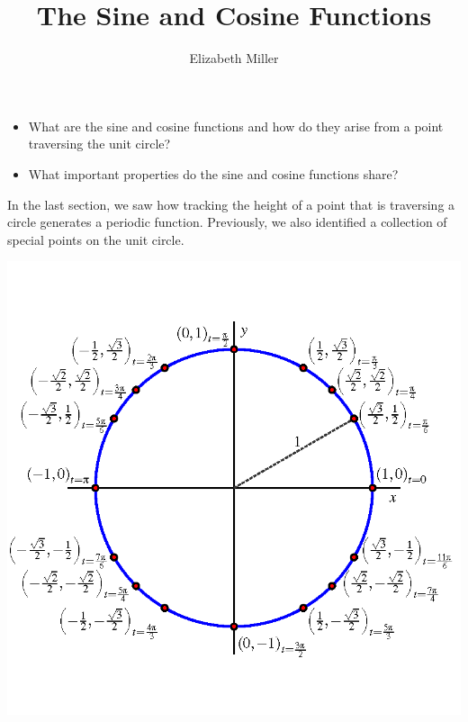 \documentclass[nooutcomes]{ximera}
\author{Elizabeth Miller}
\title{The Sine and Cosine Functions}
\begin{document}
\licenseAPC
\begin{abstract}
  
\end{abstract}
\maketitle



\begin{motivatingQuestions}\begin{itemize}
\item What are the sine and cosine functions and how do they arise from a point traversing the unit circle?%
\item What important properties do the sine and cosine functions share?%
\end{itemize}\end{motivatingQuestions}



In the last section, we saw how tracking the height of a point that is traversing a circle generates a periodic function.  Previously, we also identified a collection of special points on the unit circle.
\begin{image}
\includegraphics[width=\textwidth]{unit-circle-16-all-labeled.png}
\end{image}
\end{document}
